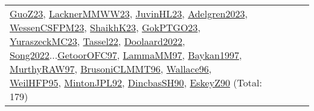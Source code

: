 {\begin{longtable}{p{3cm}r>{\raggedright\arraybackslash}p{6cm}>{\raggedright\arraybackslash}p{6cm}>{\raggedright\arraybackslash}p{8cm}}
\hyperref[detail:GuoZ23]{GuoZ23}, \hyperref[detail:LacknerMMWW23]{LacknerMMWW23}, \hyperref[detail:JuvinHL23]{JuvinHL23}, \hyperref[detail:Adelgren2023]{Adelgren2023}, \hyperref[detail:WessenCSFPM23]{WessenCSFPM23}, \hyperref[detail:ShaikhK23]{ShaikhK23}, \hyperref[detail:GokPTGO23]{GokPTGO23}, \hyperref[detail:YuraszeckMC23]{YuraszeckMC23}, \hyperref[detail:Tassel22]{Tassel22}, \hyperref[detail:Doolaard2022]{Doolaard2022}, \hyperref[detail:Song2022]{Song2022}...\hyperref[detail:GetoorOFC97]{GetoorOFC97}, \hyperref[detail:LammaMM97]{LammaMM97}, \hyperref[detail:Baykan1997]{Baykan1997}, \hyperref[detail:MurthyRAW97]{MurthyRAW97}, \hyperref[detail:BrusoniCLMMT96]{BrusoniCLMMT96}, \hyperref[detail:Wallace96]{Wallace96}, \hyperref[detail:WeilHFP95]{WeilHFP95}, \hyperref[detail:MintonJPL92]{MintonJPL92}, \hyperref[detail:DincbasSH90]{DincbasSH90}, \hyperref[detail:EskeyZ90]{EskeyZ90} (Total: 179)\\

\end{longtable}}
